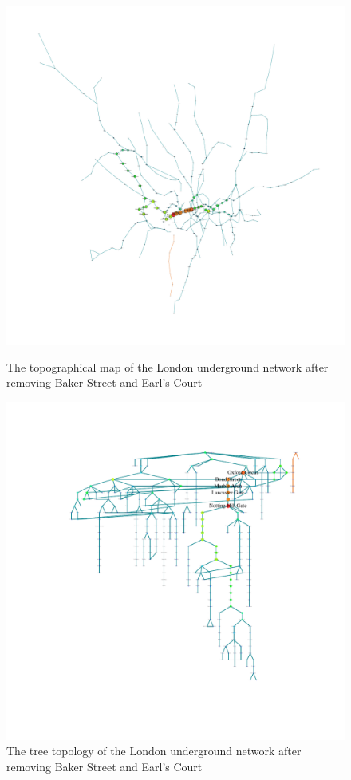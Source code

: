 \documentclass[a4paper,reqno,]{article}
\begin{document}
\begin{figure}[H]
\centering
\begin{minipage}[b]{0.49\textwidth}
\centering
    \captionsetup{width=.9\linewidth}
    \includegraphics[clip, trim=3cm 3cm 3cm 2cm,width=1\textwidth]{images/NW/5_1.pdf}
    \caption{The topographical map of the London underground network after removing Baker Street and Earl's Court}\label{fig: 5_1}
\end{minipage}
\begin{minipage}[b]{0.5\textwidth}
\centering
    \captionsetup{width=.9\linewidth}
    \includegraphics[clip, trim=3cm 3cm 2cm 2cm,width=1\textwidth]{images/NW/5_2.pdf}
    \caption{The tree topology of the London underground network after removing Baker Street and Earl's Court}\label{fig: 5_2}
\end{minipage}
\end{figure} 
\end{document}
